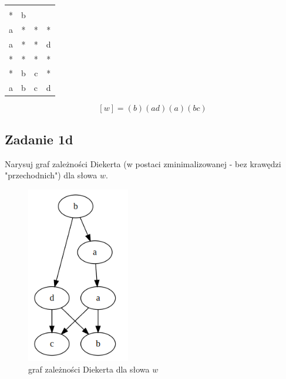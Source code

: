 \documentclass{article}
\begin{document}
\begin{table}[h]
\centering
\begin{tabular}{cccc}
\multicolumn{1}{|c|}{}  & \multicolumn{1}{c|}{}  & \multicolumn{1}{c|}{}  & \multicolumn{1}{c|}{}  \\
\multicolumn{1}{|c|}{*} & \multicolumn{1}{c|}{b} & \multicolumn{1}{c|}{}  & \multicolumn{1}{c|}{}  \\
\multicolumn{1}{|c|}{a} & \multicolumn{1}{c|}{*} & \multicolumn{1}{c|}{*} & \multicolumn{1}{c|}{*} \\
\multicolumn{1}{|c|}{a} & \multicolumn{1}{c|}{*} & \multicolumn{1}{c|}{*} & \multicolumn{1}{c|}{d} \\
\multicolumn{1}{|c|}{*} & \multicolumn{1}{c|}{*} & \multicolumn{1}{c|}{*} & \multicolumn{1}{c|}{*} \\
\multicolumn{1}{|c|}{*} & \multicolumn{1}{c|}{b} & \multicolumn{1}{c|}{c} & \multicolumn{1}{c|}{*} \\ \hline
\multicolumn{1}{l}{a}   & \multicolumn{1}{l}{b}  & \multicolumn{1}{l}{c}  & \multicolumn{1}{l}{d} 
\end{tabular}
\end{table}

$$ [w] = (b)(ad)(a)(bc) $$

\subsection{Zadanie 1d}
Narysuj graf zależności Diekerta (w postaci zminimalizowanej - bez krawędzi "przechodnich") dla słowa $w$.

\begin{figure}[H]
    \centering
    \includegraphics[width=0.4\textwidth]{graph_1.png}
    \caption{graf zależności Diekerta dla słowa $w$}
\end{figure}
\end{document}
